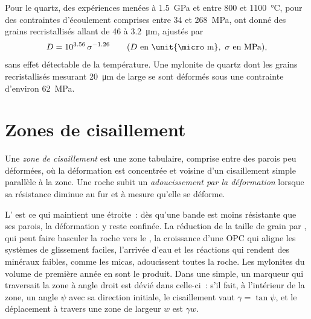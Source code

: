Pour le quartz, des expériences menées à \qty{1.5}{GPa} et entre 800 et \qty{1100}{\celsius},
pour des contraintes d'écoulement comprises entre 34 et \qty{268}{MPa}, ont donné des grains recristallisés allant de 46
à \qty{3.2}{\micro m}, ajustés par
\[
  D = 10^{3.56}\,\sigma^{-1.26}\qquad(D\text{ en \unit{\micro m}},\ \sigma\text{ en MPa}),
\]
sans effet détectable de la température. Une mylonite de quartz dont les
grains recristallisés mesurant \qty{20}{\micro m} de large se sont déformés sous
une contrainte d'environ \qty{62}{MPa}.

\section{Zones de cisaillement}

\begin{definition}\label{def:b3:deformation-mechanisms:shear-zone}
Une \emph{zone de cisaillement} est une zone tabulaire, comprise entre des parois
peu déformées, où la déformation est concentrée et voisine d'un cisaillement simple
parallèle à la zone. Une roche subit un \emph{adoucissement par
la déformation} lorsque sa résistance diminue au fur et à mesure qu'elle se déforme.
\end{definition}

L' est ce qui maintient une  étroite~: dès qu'une bande est moins résistante
que ses parois, la déformation y reste confinée. La réduction de la taille de grain par , qui peut
faire basculer la roche vers le , la croissance d'une OPC qui aligne les systèmes de glissement faciles,
l'arrivée d'eau et les réactions qui rendent
des minéraux faibles, comme les micas, adoucissent toutes la roche. Les mylonites du volume de première année en sont le produit.
Dans une  simple, un marqueur qui traversait la zone à angle droit est dévié
dans celle-ci~: s'il fait, à l'intérieur de la zone, un angle
$\psi$ avec sa direction initiale, le cisaillement vaut $\gamma
= \tan\psi$, et le déplacement à travers une zone de largeur $w$ est $\gamma w$.

